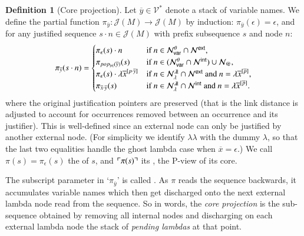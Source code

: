 \documentclass{elsarticle}
\makeatletter
\theoremstyle{plain}
\theoremstyle{definition}
\newtheorem{definition}{Definition}[section]
\newcommand\VarSet{\mathcal{V}}
\newcommand\Nodes{\mathcal{N}}%
\newcommand\NodesVar{\Nodes_{\sf var}}%
\newcommand\NodesLmd{\Nodes_\lambda}%
\newcommand\NodesApp{\Nodes_@}%
\newcommand{\ghostlmd}{{\lambda\!\!\lambda}}
\newcommand{\ghostvar}{\theta}
\newcommand\ExtendedNodesVar{\NodesVar^\ghostvar}
\newcommand\ExtendedNodesLmd{\NodesLmd^\ghostlmd}
\def\coresymbol{\pi} %
\newcommand{\core}[1]{\coresymbol(#1)} %
\newcommand{\ExternalNodes}{\Nodes^{\sf ext}}
\newcommand{\InternalNodes}{\Nodes^{\sf int}}
\def\justseqset{\mathcal{J}}
\makeatother
\begin{document}
\begin{definition}[Core projection]
\label{def:coreprojection}
Let $\overline{y} \in \VarSet^*$ denote a stack of variable names.
We define the partial function $\coresymbol_{\overline{y}}\colon \justseqset(M) \longrightarrow \justseqset(M)$ by induction: $\coresymbol_{\overline{y}}(\epsilon) = \epsilon$, and for any justified sequence $s \cdot n\in\justseqset(M)$ with prefix subsequence $s$ and node $n$:
\begin{equation*}
\coresymbol_{\overline{y}}(s\cdot n) =
\begin{cases}
    \coresymbol_{\epsilon}(s) \cdot n
    & \mbox{if } n\in\ExtendedNodesVar\inter\ExternalNodes, \\
     \coresymbol_{pop_{|n|}(\overline{y})}(s)
    & \mbox{if } n\in(\ExtendedNodesVar\inter\InternalNodes)\union\NodesApp, \\
\coresymbol_{\epsilon}(s) \cdot \lambda \overline{x}^{[p \cdot \overline{y}]}
    & \mbox{if $n  \in\ExtendedNodesLmd\inter\ExternalNodes$
        and $n = \lambda\overline{x}^{[\overline{p}]}$,} \\
    \coresymbol_{\overline{x} \cdot \overline{y}}(s)
    & \mbox{if $n \in\ExtendedNodesLmd\inter\InternalNodes$
         and $n = \lambda\overline{x}^{[\overline{p}]}$.}
\end{cases}
\end{equation*}
where the original justification pointers are preserved (that is the link distance is adjusted to account for occurrences removed between an occurrence and its justifier). This is well-defined since an external node can only be justified by another external node. (For simplicity we identify $\ghostlmd$ with the dummy $\lambda$, so that the last two equalities handle the ghost lambda case when $\overline{x}=\epsilon$.)
We call $\core{s} = \coresymbol_\epsilon(s)$ the  of $s$,
and $\pview{\core{s}}$ its , the P-view of its core.
\end{definition}

The subscript parameter in `$\coresymbol_{\overline{y}}$' is called . As $\coresymbol$ reads the sequence backwards, it accumulates variable names which then get discharged onto the next external lambda node read from the sequence. So in words, the \emph{core projection} is the sub-sequence obtained by removing all internal nodes and discharging on each external lambda node the stack of \emph{pending lambdas} at that point.
\end{document}

